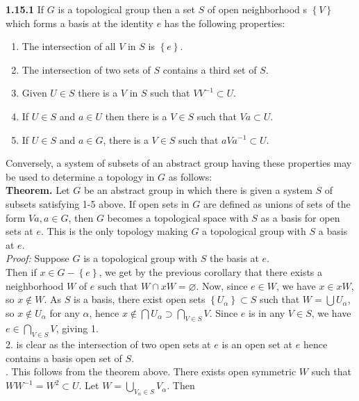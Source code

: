 \documentclass[a4paper]{article}
\theoremstyle{plain}%
\theoremstyle{definition}
\theoremstyle{remark}
\begin{document}
\textbf{1.15.1}  If $G$ is a topological group then a set $S$ of open
neighborhood s
$\left\{ V \right\} $ which forms a basis at the identity $e$ has the following
properties:
\begin{enumerate}
    \item The intersection of all $V$ in $S$ is $\left\{ e \right\} $.
    \item The intersection of two sets of $S$ contains a third set of
        $S$.
    \item Given $U \in S$ there is a $V$ in $S$ such that
        $V V^{-1} \subset U$.
    \item If $U \in S$ and $a \in U$ then there is a $V \in S$ such that
        $Va \subset U$.
    \item If $U \in S$ and $a \in G$, there is a $V \in S$ such that
        $a V a^{-1} \subset U$.
\end{enumerate}
Conversely, a system of subsets of an abstract group having these properties
may be used to determine a topology in $G$ as follows:\\
\textbf{Theorem.} Let $G$ be an abstract group in which there is given a system
$S$ of subsets satisfying 1-5 above. If open sets in $G$ are defined as unions
of sets of the form $Va, a \in G$, then $G$ becomes a topological space with
$S$ as a basis for open sets at $e$. This is the only topology making $G$
a topological group with $S$ a basis at $e$.\\
\linebreak
\textit{Proof:} Suppose $G$ is a topological group with $S$ the basis at $e$.\\
Then if $x \in G - \left\{ e \right\} $, we get by the previous corollary that
there exists a neighborhood $W$ of $e$ such that $W \cap xW = \varnothing$.
Now,
since $e \in W$, we have $x \in xW$, so $x \not\in W$. As $S$ is a basis, there
exist open sets $\left\{ U_{\alpha} \right\} \subset S$ such that
$W = \bigcup U_{\alpha} $, so 
$x \not\in U_{\alpha}$ for any $\alpha$, hence
$x \not\in  \bigcap U_{\alpha} \supset \bigcap_{V \in S} V$. Since
$e$ is in any $V \in S$, we have
$e \in \bigcap_{V \in S}V $, giving 1.\\
2. is clear as the intersection of two open sets at $e$ is an open set at $e$ 
   hence contains a basis open set of $S$.\\
   . This follows from the theorem above. There exists open symmetric $W$ such
      that $W W^{-1} = W^2 \subset U$. Let
      $W = \bigcup_{V_{\alpha} \in S} V_{\alpha}$. Then
\end{document}
